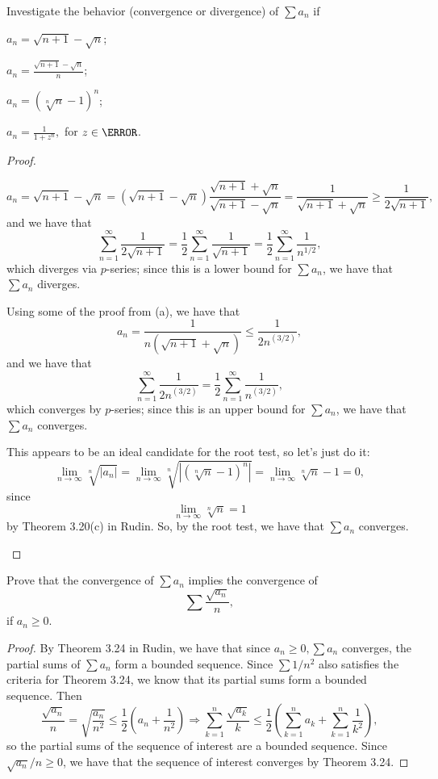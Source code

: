 \documentclass{assignment}
\begin{document}
\begin{question}[6]
  Investigate the behavior (convergence or divergence) of $\sum a_n$ if 
\begin{qparts}
  \item $a_n = \sqrt{n + 1} - \sqrt{n}$; 
  \item $a_n = \frac{\sqrt{n + 1} - \sqrt{n}}{n}$; 
  \item $a_n = (\sqrt[n]{n} - 1)^n$;
  \item $a_n = \frac{1}{1+ z^n},$ for $z\in\C$.
\end{qparts}
\end{question}
\begin{proof}\leavevmode
 \begin{qparts}
 \item $$a_n = \sqrt{n+1} - \sqrt{n} = \left(\sqrt{n+1} - \sqrt{n}\right)\frac{\sqrt{n+1} + \sqrt{n}}{\sqrt{n+1}
   - \sqrt{n}} = \frac{1}{\sqrt{n+1} + \sqrt{n}} \geq \frac{1}{2\sqrt{n+1}},$$ and we have that 
 $$\sum_{n=1}^\infty \frac{1}{2\sqrt{n+1}} = \frac{1}{2}\sum_{n=1}^\infty\frac{1}{\sqrt{n+1}} = 
 \frac{1}{2} \sum_{n=1}^\infty \frac{1}{n^{1/2}},$$ which diverges via $p$-series; since this is a
 lower bound for $\sum a_n$, we have that $\sum a_n$ diverges.

 \item Using some of the proof from (a), we have that $$a_n = \frac{1}{n(\sqrt{n+1} + \sqrt{n})}
   \leq \frac{1}{2n^{(3/2)}},$$ and we have that $$\sum_{n=1}^\infty \frac{1}{2n^{(3/2)}} =
   \frac{1}{2}\sum_{n=1}^\infty \frac{1}{n^{(3/2)}},$$ which converges by $p$-series; since this is
   an upper bound for $\sum a_n$, we have that $\sum a_n$ converges.

   \item This appears to be an ideal candidate for the root test, so let's just do it:
     $$\lim_{n\to\infty} \sqrt[n]{|a_n|} = \lim_{n\to\infty}\sqrt[n]{\left| \left( \sqrt[n]{n} - 1
     \right)^n \right|} = \lim_{n\to\infty} \sqrt[n]{n} - 1 = 0,$$ since $$\lim_{n\to\infty}
     \sqrt[n]{n} = 1$$ by Theorem 3.20(c) in Rudin. So, by the root test, we have that $\sum a_n$
     converges.
 \end{qparts} 
\end{proof}

\begin{question}[7]
  Prove that the convergence of $\sum a_n$ implies the convergence of $$\sum \frac{\sqrt{a_n}}{n},$$
if $a_n \geq 0$.
\end{question}
\begin{proof}
  By Theorem 3.24 in Rudin, we have that since $a_n \geq 0, \sum a_n$ converges, the partial sums of 
  $\sum a_n$ form a bounded sequence. Since $\sum 1/n^2$ also satisfies the criteria for Theorem 3.24, 
  we know that its partial sums form a bounded sequence. Then $$\frac{\sqrt{a_n}}{n} = 
  \sqrt{\frac{a_n}{n^2}} \leq \frac{1}{2}\left( a_n + \frac{1}{n^2} \right) \Rightarrow 
  \sum_{k=1}^n \frac{\sqrt{a_k}}{k} \leq \frac{1}{2}\left( \sum_{k=1}^n a_k + \sum_{k=1}^n \frac{1}{k^2} \right),$$
  so the partial sums of the sequence of interest are a bounded sequence. Since $\sqrt{a_n} / n \geq 0$,
  we have that the sequence of interest converges by Theorem 3.24.
\end{proof}
\end{document}
